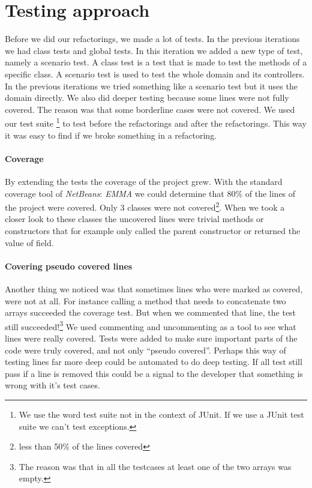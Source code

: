 \section{Testing approach}
Before we did our refactorings, we made a lot of tests. In the previous iterations we had class tests and global tests. In this iteration we added a new type of test, namely a scenario test. A class test is a test that is made to test the methods of a specific class. A scenario test is used to test the whole domain and its controllers. In the previous iterations we tried something like a scenario test but it uses the domain directly. We also did deeper testing because some lines were not fully covered. The reason was that some borderline cases were not covered. We used our test suite \footnote{We use the word test suite not in the context of JUnit. If we use a JUnit test suite we can't test exceptions.} to test before the refactorings and after the refactorings. This way it was easy to find if we broke something in a refactoring.

\paragraph{Coverage}
By extending the tests the coverage of the project grew. With the standard coverage tool of \textit{NetBeans}: \textit{EMMA} we could determine that 80\% of the lines of the project were covered. Only 3 classes were not covered\footnote{less than 50\% of the lines covered}. When we took a closer look to these classes the uncovered lines were trivial methods or constructors that for example only called the parent constructor or returned the value of field.
\paragraph{Covering pseudo covered lines}Another thing we noticed was that sometimes lines who were marked as covered, were not at all. For instance calling a method that needs to concatenate two arrays succeeded the coverage test. But when we commented that line, the test still succeeded!\footnote{The reason was that in all the testcases at least one of the two arrays was empty.} We used commenting and uncommenting as a tool to see what lines were really covered. Tests were added to make sure important parts of the code were truly covered, and not only ``pseudo covered''. Perhaps this way of testing lines far more deep could be automated to do deep testing. If all test still pass if a line is removed this could be a signal to the developer that something is wrong with it's test cases.
